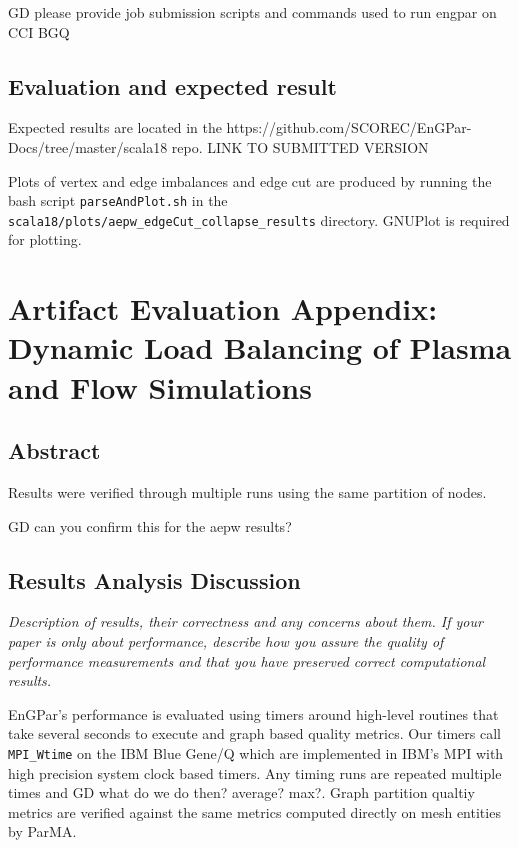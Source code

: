 {\color{red} GD please provide job submission scripts and commands
used to run engpar on CCI BGQ}

\subsection{Evaluation and expected result}

Expected results are located in the 
https://github.com/SCOREC/EnGPar-Docs/tree/master/scala18
repo.
{\color{red} LINK TO SUBMITTED VERSION}

Plots of vertex and edge imbalances and edge cut are produced by
running the bash script \texttt{parseAndPlot.sh} in the
\texttt{scala18/plots/aepw\_edgeCut\_collapse\_results} directory.
GNUPlot is required for plotting.

\section{Artifact Evaluation Appendix: Dynamic Load Balancing of Plasma and Flow Simulations}

\subsection{Abstract}

Results were verified through multiple runs using the same partition of nodes.

{\color{red} GD can you confirm this for the aepw results?}


\subsection{Results Analysis Discussion}

{\em Description of results, their correctness and any concerns about them. If your paper is only about performance, describe how you assure the quality of performance measurements and that you have preserved correct computational results.}

EnGPar's performance is evaluated using timers around high-level routines that
take several seconds to execute and graph based quality metrics.
Our timers call \texttt{MPI\_Wtime} on the IBM Blue Gene/Q which are implemented
in IBM's MPI with high precision system clock based timers.
Any timing runs are repeated multiple times and {\color{red} GD what do we do then? average?
max?}.
Graph partition qualtiy metrics are verified against the same metrics computed
directly on mesh entities by ParMA.

